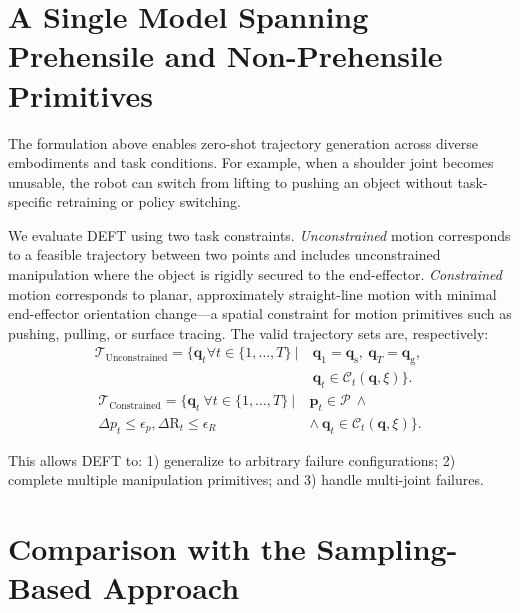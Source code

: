 \section{A Single Model Spanning Prehensile and Non-Prehensile Primitives}
\label{sec:failures:unified}

The formulation above enables zero-shot trajectory generation across diverse embodiments and task conditions. For example, when a shoulder joint becomes unusable, the robot can switch from lifting to pushing an object without task-specific retraining or policy switching.

We evaluate DEFT using two task constraints. \textit{Unconstrained} motion corresponds to a feasible trajectory between two points and includes unconstrained manipulation where the object is rigidly secured to the end-effector. \textit{Constrained} motion corresponds to planar, approximately straight-line motion with minimal end-effector orientation change---a spatial constraint for motion primitives such as pushing, pulling, or surface tracing. The valid trajectory sets are, respectively:
\begin{equation}
\begin{aligned}
  \mathcal{T}_\text{Unconstrained}=\Big\{\mathbf{q}_t \forall t\in\{1,\dots,T\}\ \Big|\
  & \mathbf{q}_1=\mathbf{q}_\text{s},\  \mathbf{q}_T=\mathbf{q}_\text{g},\ \\
  & \mathbf{q}_t\in \mathcal{C}_t(\mathbf{q},\xi)\Big\}.
\end{aligned}
\end{equation}
\begin{equation}
\begin{aligned}
  \mathcal{T}_\text{Constrained}
  = \Big\{\mathbf{q}_{t}\ \forall t\in\{1,\dots,T\}\ \Big|\ &
  \mathbf{p}_t\in\mathcal{P}\ \land\ \\ \Delta p_t\le \epsilon_p,
   \Delta \mathrm{R}_t\le \epsilon_R\ & \land\ \mathbf{q}_t\in \mathcal{C}_t(\mathbf{q},\xi)
  \Big\}.
\end{aligned}
\end{equation}

This allows \textsc{DEFT} to: 1) generalize to arbitrary failure configurations; 2) complete multiple manipulation primitives; and 3) handle multi-joint failures.

\section{Comparison with the Sampling-Based Approach}
\label{sec:failures:comparison}


